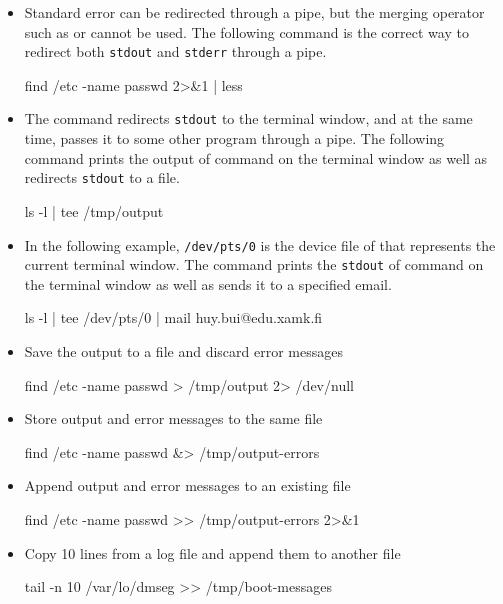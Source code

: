 \begin{itemize}
\item Standard error can be redirected through a pipe, but the merging operator such as \code{&>} or \code{&>>} cannot be used. The following command is the correct way to redirect both \verb|stdout| and \verb|stderr| through a pipe.
\begin{commandshell}
find /etc -name passwd 2>&1 | less
\end{commandshell}

\item The  command redirects \verb|stdout| to the terminal window, and at the same time, passes it to some other program through a pipe. The following command prints the output of  command on the terminal window as well as redirects \verb|stdout| to a file.
\begin{commandshell}
ls -l | tee /tmp/output
\end{commandshell}

\item In the following example,  \verb|/dev/pts/0| is the device file of that represents the current terminal window. The command prints the \verb|stdout| of  command on the terminal window as well as sends it to a specified email.
\begin{commandshell}
ls -l | tee /dev/pts/0 | mail huy.bui@edu.xamk.fi
\end{commandshell}

\item Save the output to a file and discard error messages
\begin{commandshell}
find /etc -name passwd > /tmp/output 2> /dev/null
\end{commandshell}

\item Store output and error messages to the same file
\begin{commandshell}
find /etc -name passwd &> /tmp/output-errors
\end{commandshell}

\item Append output and error messages to an existing file
\begin{commandshell}
find /etc -name passwd >> /tmp/output-errors 2>&1
\end{commandshell}

\item Copy 10 lines from a log file and append them to another file
\begin{commandshell}
tail -n 10 /var/lo/dmseg >> /tmp/boot-messages
\end{commandshell}


\end{itemize}
